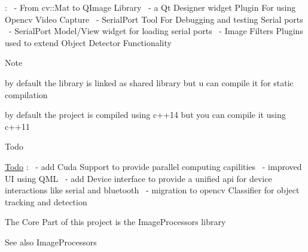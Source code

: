 \+: ~-\/ From cv\+::\+Mat to Q\+Image Library ~-\/ a Qt Designer widget Plugin For using Opencv Video Capture ~-\/ Serial\+Port Tool For Debugging and testing Serial ports ~-\/ Serial\+Port Model/\+View widget for loading serial ports ~-\/ Image Filters Plugins used to extend Object Detector Functionality \begin{DoxyNote}{Note}


by default the library is linked as shared library but u can compile it for static compilation 

by default the project is compiled using c++14 but you can compile it using c++11 
\end{DoxyNote}
\begin{DoxyRefDesc}{Todo}
\item[\hyperlink{todo__todo000004}{Todo}]\+: ~-\/ add Cuda Support to provide parallel computing capilities ~-\/ improved UI using Q\+ML ~-\/ add Device interface to provide a unified api for device interactions like serial and bluetooth ~-\/ migration to opencv Classifier for object tracking and detection \end{DoxyRefDesc}


The Core Part of this project is the Image\+Processors library \begin{DoxySeeAlso}{See also}
Image\+Processors  
\end{DoxySeeAlso}
